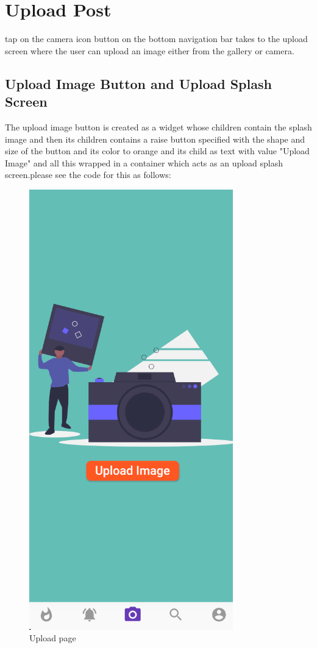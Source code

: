 \section{Upload Post}
tap on the camera icon button on the bottom navigation bar takes to the upload screen where the user can upload an image either from the gallery or camera.
\subsection{Upload Image Button and Upload Splash Screen}
The upload image button is created as a widget whose children contain the splash  image and then its children contains a raise button specified with the shape and size of the button and its color to orange and its child as text with value "Upload Image" and all this wrapped in a container which acts as an upload splash screen.please see the code for this as follows:

\begin{figure}[!htb]
    \centering
    \includegraphics[scale=0.80]{AppScreenShots/upload image.PNG}
    \caption{Upload page}
    \label{fig:Upload Page}
\end{figure}


